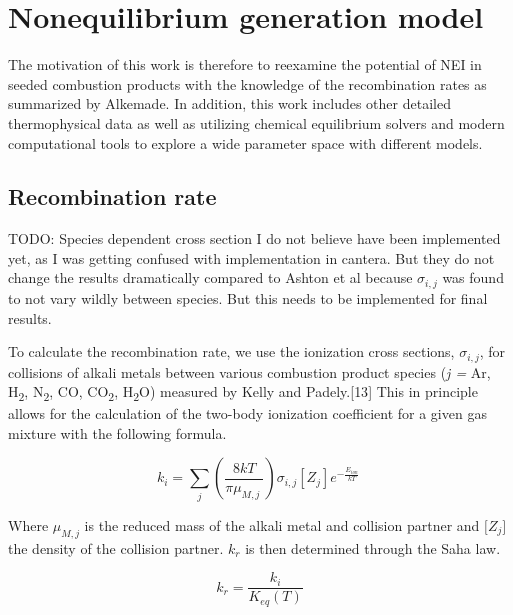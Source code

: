 
\hypertarget{nonequilibrium-generation-model}{%
\section{Nonequilibrium generation model}\label{nonequilibrium-generation-model}}

The motivation of this work is therefore to reexamine the potential of NEI in seeded combustion products with the knowledge of the recombination rates as summarized by Alkemade. In addition, this work includes other detailed thermophysical data as well as utilizing chemical equilibrium solvers and modern computational tools to explore a wide parameter space with different models.

\hypertarget{recombination-rate}{%
\subsection{Recombination rate}\label{recombination-rate}}

TODO: Species dependent cross section I do not believe have been implemented yet, as I was getting confused with implementation in cantera. But they do not change the results dramatically compared to Ashton et al because \(\sigma_{i,j}\) was found to not vary wildly between species. But this needs to be implemented for final results.

To calculate the recombination rate, we use the ionization cross sections, \(\sigma_{i,j}\), for collisions of alkali metals between various combustion product species (\emph{j =} Ar, H\textsubscript{2}, N\textsubscript{2}, CO, CO\textsubscript{2}, H\textsubscript{2}O) measured by Kelly and Padely.{[}13{]} This in principle allows for the calculation of the two-body ionization coefficient for a given gas mixture with the following formula.

\begin{equation}
k_{i} = \sum_{j}^{}{\left( \frac{8kT}{\pi\mu_{M,j}\ } \right)\sigma_{i,j}\left\lbrack Z_{j} \right\rbrack e^{- \frac{E_{ion}}{kT}}\ }
\end{equation}


Where \(\mu_{M,j}\) is the reduced mass of the alkali metal and collision partner and \(\lbrack Z_{j}\rbrack\) the density of the collision partner. \(k_{r}\) is then determined through the Saha law.

\begin{equation}
k_{r} = \frac{k_{i}}{K_{eq}(T)}
\end{equation}

